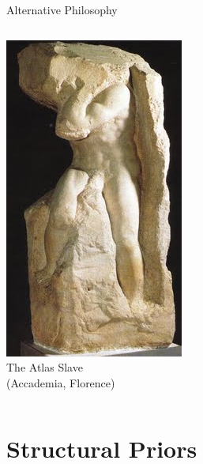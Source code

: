 \documentclass[t,xcolor=dvipsnames]{beamer}
\begin{document}
\begin{frame}{Alternative Philosophy}
\begin{columns}[onlytextwidth,T]
\begin{column}{0.34\textwidth}
\includegraphics[width=\textwidth]{statue}\\
\tiny \flushright 
The Atlas Slave\\(Accademia, Florence)
\end{column}
\end{columns}
\end{frame}

\section{Structural Priors}
\end{document}
